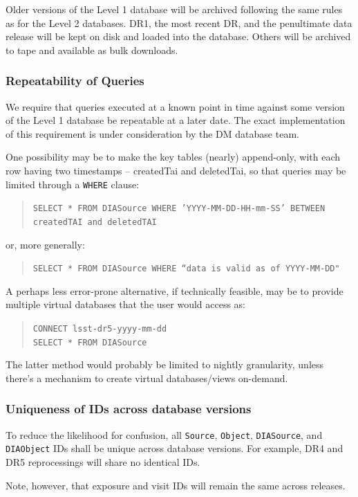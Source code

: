 \documentclass[12pt]{article}
\newcommand{\code}[1]{\texttt{#1}}
\newcommand{\DIASource}{\code{DIASource}\xspace}
\newcommand{\DIAObject}{\code{DIAObject}\xspace}
\newcommand{\DB}{{Level 1 database}\xspace}
\newcommand{\DR}{{Level 2 database}\xspace}
\newcommand{\Object}{\code{Object}\xspace}
\newcommand{\Source}{\code{Source}\xspace}
\begin{document}
Older versions of the \DB will be archived following the same rules as for the
\DR{}s. DR1, the most recent DR, and the penultimate data release will be kept
on disk and loaded into the database. Others will be archived to tape and
available as bulk downloads.

\subsubsection{Repeatability of Queries}

We require that queries executed at a known point in time against some version
of the \DB be repeatable at a later date. The exact implementation of this
requirement is under consideration by the DM database team.

One possibility may be to make the key tables (nearly) append-only, with each
row having two timestamps -- createdTai and deletedTai, so that queries may be
limited through a \code{WHERE} clause:
%
\begin{quote}
\texttt{SELECT * FROM DIASource WHERE 'YYYY-MM-DD-HH-mm-SS' BETWEEN createdTAI and deletedTAI}
\end{quote}
%
or, more generally:
%
\begin{quote}
\code{SELECT * FROM DIASource WHERE ``data is valid as of YYYY-MM-DD"}
\end{quote}

A perhaps less error-prone alternative, if technically feasible, may be to
provide multiple virtual databases that the user would access as:
%
\begin{quote}
\texttt{CONNECT lsst-dr5-yyyy-mm-dd} \\
\texttt{SELECT * FROM DIASource}
\end{quote}
%
The latter method would probably be limited to nightly granularity, unless
there's a mechanism to create virtual databases/views on-demand.

\subsubsection{Uniqueness of IDs across database versions}

To reduce the likelihood for confusion, all \Source, \Object, \DIASource, and
\DIAObject IDs shall be unique across database versions. For example, DR4 and
DR5 reprocessings will share no identical IDs. 

Note, however, that exposure and visit IDs will remain the same across
releases.
\end{document}
